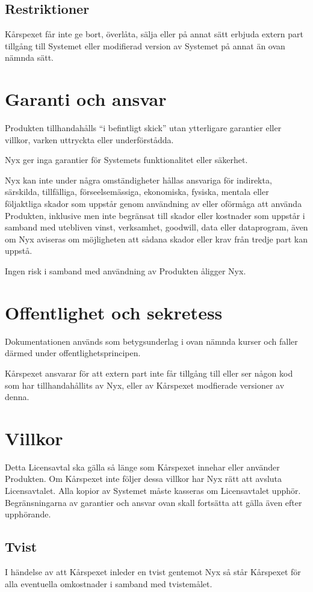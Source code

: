\documentclass[a4paper,11pt]{article}
\begin{document}
\subsection{Restriktioner}
Kårspexet får inte ge bort, överlåta, sälja eller på annat sätt erbjuda extern part tillgång till Systemet eller modifierad version av Systemet på annat än ovan nämnda sätt. 

\section{Garanti och ansvar}
Produkten tillhandahålls ``i befintligt skick'' utan ytterligare garantier eller villkor, varken uttryckta eller underförstådda.

Nyx ger inga garantier för Systemets funktionalitet eller säkerhet. 

Nyx kan inte under några omständigheter hållas ansvariga för indirekta, särskilda, tillfälliga, förseelsemässiga, ekonomiska, fysiska, mentala eller följaktliga skador som uppstår genom användning av eller oförmåga att använda Produkten, inklusive men inte begränsat till skador eller kostnader som uppstår i samband med utebliven vinst, verksamhet, goodwill, data eller dataprogram, även om Nyx aviseras om möjligheten att sådana skador eller krav från tredje part kan uppstå.

Ingen risk i samband med användning av Produkten åligger Nyx.

\section{Offentlighet och sekretess}
Dokumentationen används som betygsunderlag i ovan nämnda kurser och faller därmed under offentlighetsprincipen. 

Kårspexet ansvarar för att extern part inte får tillgång till eller ser någon kod som har tillhandahållits av Nyx, eller av Kårspexet modfierade versioner av denna.   

\section{Villkor}
Detta Licensavtal ska gälla så länge som Kårspexet innehar eller använder Produkten. 
Om Kårspexet inte följer dessa villkor har Nyx rätt att avsluta Licensavtalet. 
Alla kopior av Systemet måste kasseras om Licensavtalet upphör.
Begränsningarna av garantier och ansvar ovan skall fortsätta att gälla även efter upphörande.

\subsection{Tvist}
I händelse av att Kårspexet inleder en tvist gentemot Nyx så står Kårspexet för alla eventuella omkostnader i samband med tvistemålet.
\end{document}
